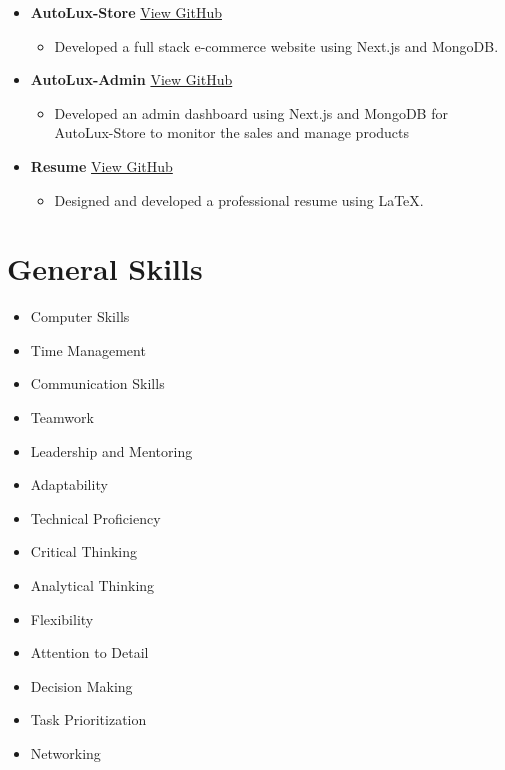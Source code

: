\documentclass[%
               doublesided,
               paper=a4,
               fontsize=10pt
              ]{my-resume}
\begin{document}
{\begin{itemize}
      \item \textbf{AutoLux-Store} \hfill \href{https://github.com/alvin-dennis/AutoLux-Store}{View GitHub}
   \begin{itemize}
      \item Developed a full stack e-commerce website using Next.js and MongoDB.
   \end{itemize}

      \item \textbf{AutoLux-Admin} \hfill \href{https://github.com/alvin-dennis/AutoLux-Admin}{View GitHub}
   \begin{itemize}
      \item Developed an admin dashboard using Next.js and MongoDB for AutoLux-Store to monitor the sales and manage products
   \end{itemize}

      \item \textbf{Resume} \hfill \href{https://github.com/alvin-dennis/Resume}{View GitHub}
   \begin{itemize}
      \item Designed and developed a professional resume using LaTeX.
   \end{itemize}

   \end{itemize}

    \section{General Skills}
    \begin{multicols}{2}
    \raggedright
    \begin{itemize}[noitemsep]
        \item Computer Skills
        \item Time Management
        \item Communication Skills
        \item Teamwork
        \item Leadership and Mentoring
        \item Adaptability
        \item Technical Proficiency
        \item Critical Thinking
        \item Analytical Thinking
        \item Flexibility
        \item Attention to Detail
        \item Decision Making
        \item Task Prioritization
        \item Networking
    \end{itemize}
    \end{multicols}   
    \medskip

}
\makebody
\clearpage
\end{document}
